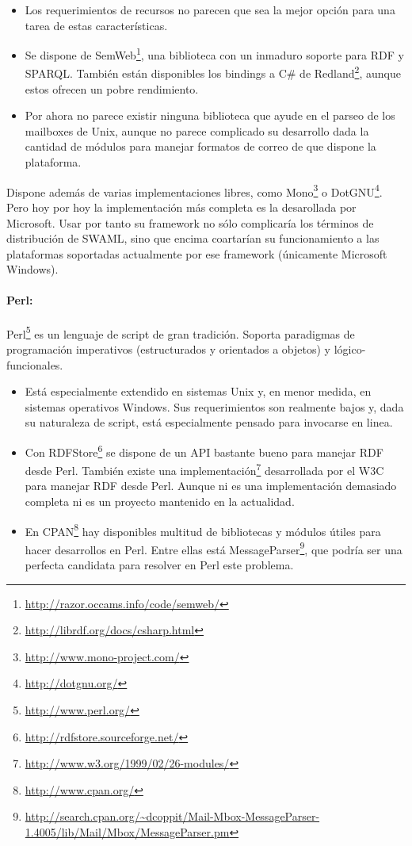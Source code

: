 \begin{itemize}
  \item Los requerimientos de recursos no parecen que sea la mejor opción para una tarea
	de estas características.
  \item Se dispone de SemWeb\footnote{\url{http://razor.occams.info/code/semweb/}}, una
	biblioteca con un inmaduro soporte para RDF y SPARQL. También están disponibles los 
	bindings a C\# de Redland\footnote{\url{http://librdf.org/docs/csharp.html}}, 
	aunque estos ofrecen un pobre rendimiento.
  \item Por ahora no parece existir ninguna biblioteca que ayude en el parseo de los mailboxes 
	de Unix, aunque no parece complicado su desarrollo dada la cantidad de módulos para 
	manejar formatos de correo de que dispone la plataforma.
\end{itemize}

Dispone además de varias implementaciones libres, como 
Mono\footnote{\url{http://www.mono-project.com/}} o DotGNU\footnote{\url{http://dotgnu.org/}}.
Pero hoy por hoy la implementación más completa es la desarollada por Microsoft. Usar por 
tanto su framework no sólo complicaría los términos de distribución de SWAML, sino que 
encima coartarían su funcionamiento a las plataformas soportadas actualmente por ese 
framework (únicamente Microsoft Windows).


\paragraph{Perl:}Perl\footnote{\url{http://www.perl.org/}} es un lenguaje de script de 
gran tradición. Soporta paradigmas de programación imperativos (estructurados y orientados 
a objetos) y lógico-funcionales.

\begin{itemize}
  \item Está especialmente extendido en sistemas Unix y, en menor medida, en sistemas
	operativos Windows. Sus requerimientos son realmente bajos y, dada su naturaleza
	de script, está especialmente pensado para invocarse en linea.
  \item Con RDFStore\footnote{\url{http://rdfstore.sourceforge.net/}} se dispone de un 
	API bastante bueno para manejar RDF desde Perl. También existe una
	implementación\footnote{\url{http://www.w3.org/1999/02/26-modules/}} 
	desarrollada por el W3C para manejar RDF desde Perl. Aunque ni es una implementación
	demasiado completa ni es un proyecto mantenido en la actualidad.
  \item En CPAN\footnote{\url{http://www.cpan.org/}} hay disponibles multitud de bibliotecas
	y módulos útiles para hacer desarrollos en Perl. Entre ellas está
	MessageParser\footnote{\url{http://search.cpan.org/~dcoppit/Mail-Mbox-MessageParser-1.4005/lib/Mail/Mbox/MessageParser.pm}},
	que podría ser una perfecta candidata para resolver en Perl este problema.
\end{itemize}

